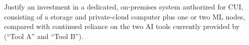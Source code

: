 
Justify an investment in a dedicated, on-premises system authorized for CUI,
consisting of a storage and private-cloud computer plus one or two ML nodes,
compared with continued reliance on the two AI tools currently provided by
 (``Tool A'' and ``Tool B'').
